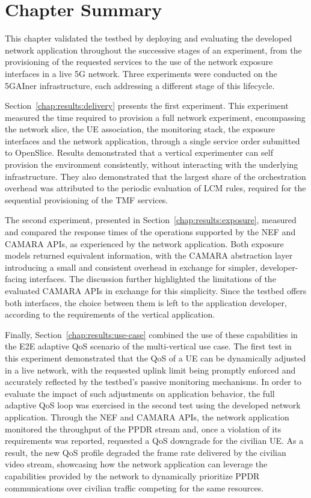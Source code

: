 \section{Chapter Summary}
\label{chap:results:summary}

This chapter validated the testbed by deploying and evaluating the developed network application throughout the successive stages of an experiment, from the provisioning of the requested services to the use of the network exposure interfaces in a live \acs{5G} network. Three experiments were conducted on the 5GAIner infrastructure, each addressing a different stage of this lifecycle.

Section~\ref{chap:results:delivery} presents the first experiment. This experiment measured the time required to provision a full network experiment, encompassing the network slice, the \acs{UE} association, the monitoring stack, the exposure interfaces and the network application, through a single service order submitted to OpenSlice. Results demonstrated that a vertical experimenter can self provision the environment consistently, without interacting with the underlying infrastructure. They also demonstrated that the largest share of the orchestration overhead was attributed to the periodic evaluation of \acs{LCM} rules, required for the sequential provisioning of the \acs{TMF} services.

The second experiment, presented in Section~\ref{chap:results:exposure}, measured and compared the response times of the operations supported by the \acs{NEF} and CAMARA \acsp{API}, as experienced by the network application. Both exposure models returned equivalent information, with the CAMARA abstraction layer introducing a small and consistent overhead in exchange for simpler, developer-facing interfaces. The discussion further highlighted the limitations of the evaluated CAMARA \acsp{API} in exchange for this simplicity. Since the testbed offers both interfaces, the choice between them is left to the application developer, according to the requirements of the vertical application.

Finally, Section~\ref{chap:results:use-case} combined the use of these capabilities in the \acs{E2E} adaptive \acs{QoS} scenario of the multi-vertical use case. The first test in this experiment demonstrated that the \acs{QoS} of a \acs{UE} can be dynamically adjusted in a live network, with the requested uplink limit being promptly enforced and accurately reflected by the testbed's passive monitoring mechanisms. In order to evaluate the impact of such adjustments on application behavior, the full adaptive \acs{QoS} loop was exercised in the second test using the developed network application. Through the \acs{NEF} and CAMARA \acsp{API}, the network application monitored the throughput of the \acs{PPDR} stream and, once a violation of its requirements was reported, requested a \acs{QoS} downgrade for the civilian \acs{UE}. As a result, the new \acs{QoS} profile degraded the frame rate delivered by the civilian video stream, showcasing how the network application can leverage the capabilities provided by the network to dynamically prioritize \acs{PPDR} communications over civilian traffic competing for the same resources.
